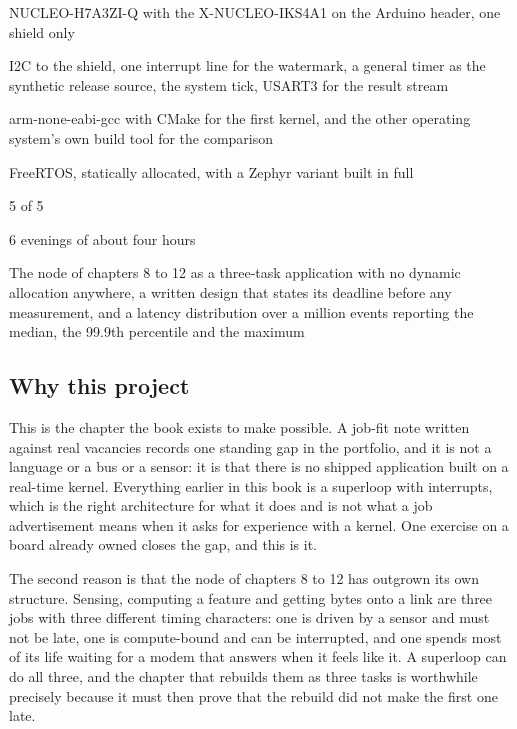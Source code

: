 
\begin{keyfacts}
\item[Board] NUCLEO-H7A3ZI-Q with the X-NUCLEO-IKS4A1 on the Arduino header, one shield only
\item[Peripherals] I2C to the shield, one interrupt line for the watermark, a general timer as the synthetic release source, the system tick, USART3 for the result stream
\item[Toolchain] arm-none-eabi-gcc with CMake for the first kernel, and the other operating system's own build tool for the comparison
\item[Operating system] FreeRTOS, statically allocated, with a Zephyr variant built in full
\item[Difficulty] 5 of 5
\item[Effort] 6 evenings of about four hours
\item[Deliverable] The node of chapters 8 to 12 as a three-task application with no dynamic allocation anywhere, a written design that states its deadline before any measurement, and a latency distribution over a million events reporting the median, the 99.9th percentile and the maximum
\end{keyfacts}

\subsection*{Why this project}

This is the chapter the book exists to make possible. A job-fit note written
against real vacancies records one standing gap in the portfolio, and it is not
a language or a bus or a sensor: it is that there is no shipped application
built on a real-time kernel. Everything earlier in this book is a superloop
with interrupts, which is the right architecture for what it does and is not
what a job advertisement means when it asks for experience with a kernel. One
exercise on a board already owned closes the gap, and this is it.

The second reason is that the node of chapters 8 to 12 has outgrown its own
structure. Sensing, computing a feature and getting bytes onto a link are three
jobs with three different timing characters: one is driven by a sensor and must
not be late, one is compute-bound and can be interrupted, and one spends most
of its life waiting for a modem that answers when it feels like it. A superloop
can do all three, and the chapter that rebuilds them as three tasks is
worthwhile precisely because it must then prove that the rebuild did not make
the first one late.

